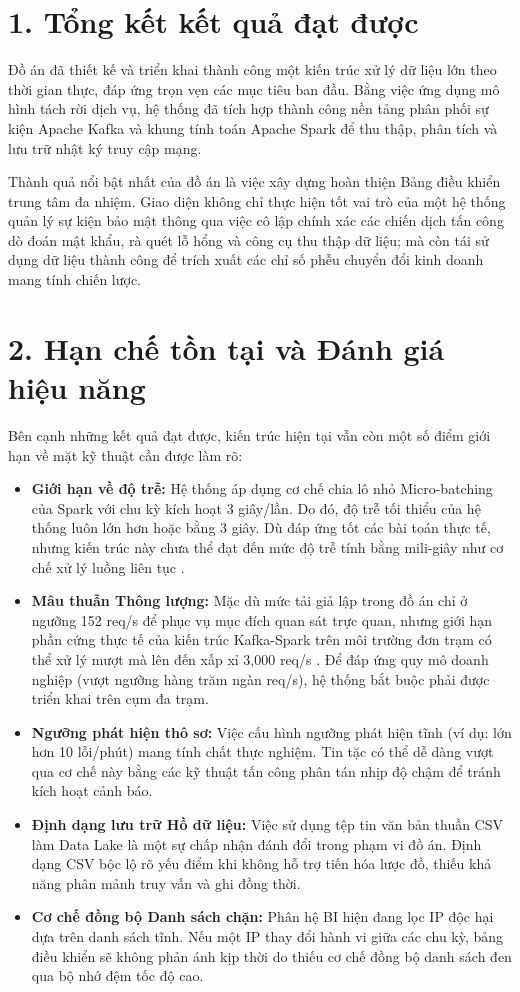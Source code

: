 \documentclass[12pt,a4paper]{report}
\begin{document}
\section*{1. Tổng kết kết quả đạt được}
Đồ án đã thiết kế và triển khai thành công một kiến trúc xử lý dữ liệu lớn theo thời gian thực, đáp ứng trọn vẹn các mục tiêu ban đầu. Bằng việc ứng dụng mô hình tách rời dịch vụ, hệ thống đã tích hợp thành công nền tảng phân phối sự kiện Apache Kafka và khung tính toán Apache Spark để thu thập, phân tích và lưu trữ nhật ký truy cập mạng. 

Thành quả nổi bật nhất của đồ án là việc xây dựng hoàn thiện Bảng điều khiển trung tâm đa nhiệm. Giao diện không chỉ thực hiện tốt vai trò của một hệ thống quản lý sự kiện bảo mật thông qua việc cô lập chính xác các chiến dịch tấn công dò đoán mật khẩu, rà quét lỗ hổng và công cụ thu thập dữ liệu; mà còn tái sử dụng dữ liệu thành công để trích xuất các chỉ số phễu chuyển đổi kinh doanh mang tính chiến lược.

\section*{2. Hạn chế tồn tại và Đánh giá hiệu năng}
Bên cạnh những kết quả đạt được, kiến trúc hiện tại vẫn còn một số điểm giới hạn về mặt kỹ thuật cần được làm rõ:
\begin{itemize}
    \item \textbf{Giới hạn về độ trễ:} Hệ thống áp dụng cơ chế chia lô nhỏ Micro-batching của Spark với chu kỳ kích hoạt 3 giây/lần. Do đó, độ trễ tối thiểu của hệ thống luôn lớn hơn hoặc bằng 3 giây. Dù đáp ứng tốt các bài toán thực tế, nhưng kiến trúc này chưa thể đạt đến mức độ trễ tính bằng mili-giây như cơ chế xử lý luồng liên tục \cite{zaharia2013}.
    \item \textbf{Mâu thuẫn Thông lượng:} Mặc dù mức tải giả lập trong đồ án chỉ ở ngưỡng 152 req/s để phục vụ mục đích quan sát trực quan, nhưng giới hạn phần cứng thực tế của kiến trúc Kafka-Spark trên môi trường đơn trạm có thể xử lý mượt mà lên đến xấp xỉ 3,000 req/s \cite{confluent_bench}. Để đáp ứng quy mô doanh nghiệp (vượt ngưỡng hàng trăm ngàn req/s), hệ thống bắt buộc phải được triển khai trên cụm đa trạm.
    \item \textbf{Ngưỡng phát hiện thô sơ:} Việc cấu hình ngưỡng phát hiện tĩnh (ví dụ: lớn hơn 10 lỗi/phút) mang tính chất thực nghiệm. Tin tặc có thể dễ dàng vượt qua cơ chế này bằng các kỹ thuật tấn công phân tán nhịp độ chậm để tránh kích hoạt cảnh báo.
    \item \textbf{Định dạng lưu trữ Hồ dữ liệu:} Việc sử dụng tệp tin văn bản thuần CSV làm Data Lake là một sự chấp nhận đánh đổi trong phạm vi đồ án. Định dạng CSV bộc lộ rõ yếu điểm khi không hỗ trợ tiến hóa lược đồ, thiếu khả năng phân mảnh truy vấn và ghi đồng thời.
    \item \textbf{Cơ chế đồng bộ Danh sách chặn:} Phân hệ BI hiện đang lọc IP độc hại dựa trên danh sách tĩnh. Nếu một IP thay đổi hành vi giữa các chu kỳ, bảng điều khiển sẽ không phản ánh kịp thời do thiếu cơ chế đồng bộ danh sách đen qua bộ nhớ đệm tốc độ cao.
\end{itemize}
\end{document}

